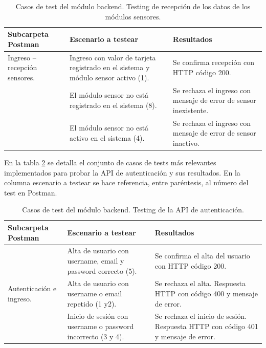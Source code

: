 \begin{table}[h]
	\centering
	\caption[Tipos de pruebas backend]{Casos de test del módulo backend. Testing de recepción de los datos de los módulos sensores.}
	\begin{tabular}{p{3.5cm} p{4.5cm} p{4cm}} 	

		\toprule
		\textbf{Subcarpeta Postman} & 
		\textbf{Escenario a testear} &
		\textbf{Resultados} 
		\\
		\midrule

 Ingreso – recepción sensores.                  
& Ingreso con valor de tarjeta registrado en el sistema y módulo sensor activo (1).
& Se confirma recepción con HTTP código 200.  \\
& El módulo sensor no está registrado en el sistema  (8).
& Se rechaza el ingreso con mensaje de error de sensor inexistente. \\
& El módulo sensor no está activo en el sistema (4). 
& Se rechaza el ingreso con mensaje de error de sensor inactivo. \\
		\bottomrule
		\hline
	\end{tabular}
	\label{tab:tablaTestBackendSensor}
\end{table}

En la tabla  \ref{tab:tablaTestBackendAutenticacion} se detalla el conjunto de casos de tests más relevantes implementados para probar la API de autenticación y sus resultados. En la columna escenario a testear se hace referencia, entre paréntesis, al número del test en Postman.

\begin{table}[h]
	\centering
	\caption[Tipos de pruebas backend]{Casos de test del módulo backend. Testing de la API de autenticación.}
	\begin{tabular}{p{3.5cm} p{4.5cm} p{4cm}} 	

		\toprule
		\textbf{Subcarpeta Postman} & 
		\textbf{Escenario a testear} &
		\textbf{Resultados} 
		\\
		\midrule
\multirow{3}{3.5cm}{Autenticación e ingreso.} & Alta de usuario con username, email y password correcto (5). & Se confirma el alta del usuario con HTTP código 200. \\
                    & Alta de usuario con username o email repetido (1 y2). & Se rechaza el alta. Respuesta HTTP con código 400 y mensaje de error. \\
                    & Inicio de sesión con username o password incorrecto (3 y 4). & Se rechaza el inicio de sesión. Respuesta HTTP con código 401 y mensaje de error. \\
		\bottomrule
		\hline
	\end{tabular}
	\label{tab:tablaTestBackendAutenticacion}
\end{table}


